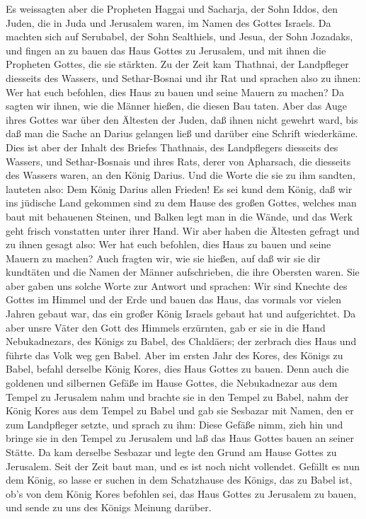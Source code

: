  Es weissagten aber die Propheten Haggai und Sacharja, der
Sohn Iddos, den Juden, die in Juda und Jerusalem waren, im Namen des
Gottes Israels.  Da machten sich auf Serubabel, der Sohn
Sealthiels, und Jesua, der Sohn Jozadaks, und fingen an zu bauen das
Haus Gottes zu Jerusalem, und mit ihnen die Propheten Gottes, die sie
stärkten.  Zu der Zeit kam Thathnai, der Landpfleger
diesseits des Wassers, und Sethar-Bosnai und ihr Rat und sprachen also
zu ihnen: Wer hat euch befohlen, dies Haus zu bauen und seine Mauern zu
machen?  Da sagten wir ihnen, wie die Männer hießen, die
diesen Bau taten.  Aber das Auge ihres Gottes war über den
Ältesten der Juden, daß ihnen nicht gewehrt ward, bis daß man die Sache
an Darius gelangen ließ und darüber eine Schrift wiederkäme.
 Dies ist aber der Inhalt des Briefes Thathnais, des
Landpflegers diesseits des Wassers, und Sethar-Bosnais und ihres Rats,
derer von Apharsach, die diesseits des Wassers waren, an den König
Darius.  Und die Worte die sie zu ihm sandten, lauteten
also: Dem König Darius allen Frieden!  Es sei kund dem
König, daß wir ins jüdische Land gekommen sind zu dem Hause des großen
Gottes, welches man baut mit behauenen Steinen, und Balken legt man in
die Wände, und das Werk geht frisch vonstatten unter ihrer Hand.
 Wir aber haben die Ältesten gefragt und zu ihnen gesagt
also: Wer hat euch befohlen, dies Haus zu bauen und seine Mauern zu
machen?  Auch fragten wir, wie sie hießen, auf daß wir sie
dir kundtäten und die Namen der Männer aufschrieben, die ihre Obersten
waren.  Sie aber gaben uns solche Worte zur Antwort und
sprachen: Wir sind Knechte des Gottes im Himmel und der Erde und bauen
das Haus, das vormals vor vielen Jahren gebaut war, das ein großer König
Israels gebaut hat und aufgerichtet.  Da aber unsre Väter
den Gott des Himmels erzürnten, gab er sie in die Hand Nebukadnezars,
des Königs zu Babel, des Chaldäers; der zerbrach dies Haus und führte
das Volk weg gen Babel.  Aber im ersten Jahr des Kores, des
Königs zu Babel, befahl derselbe König Kores, dies Haus Gottes zu bauen.
 Denn auch die goldenen und silbernen Gefäße im Hause
Gottes, die Nebukadnezar aus dem Tempel zu Jerusalem nahm und brachte
sie in den Tempel zu Babel, nahm der König Kores aus dem Tempel zu Babel
und gab sie Sesbazar mit Namen, den er zum Landpfleger setzte,
 und sprach zu ihm: Diese Gefäße nimm, zieh hin und bringe
sie in den Tempel zu Jerusalem und laß das Haus Gottes bauen an seiner
Stätte.  Da kam derselbe Sesbazar und legte den Grund am
Hause Gottes zu Jerusalem. Seit der Zeit baut man, und es ist noch nicht
vollendet.  Gefällt es nun dem König, so lasse er suchen in
dem Schatzhause des Königs, das zu Babel ist, ob's von dem König Kores
befohlen sei, das Haus Gottes zu Jerusalem zu bauen, und sende zu uns
des Königs Meinung darüber.

